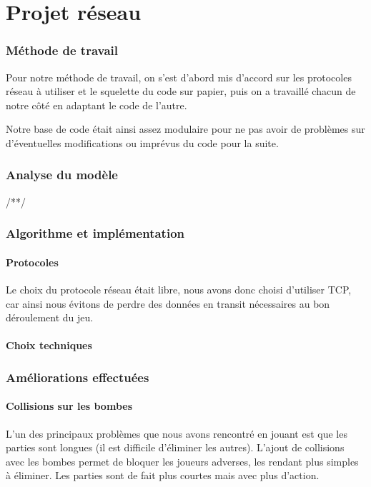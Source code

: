 \documentclass[a4paper]{article}
\begin{document}
\newpage
\part{Projet réseau}

	\section{Méthode de travail}

	Pour notre méthode de travail, on s'est d'abord mis d'accord sur les protocoles réseau à utiliser et le squelette du code sur papier, puis on a travaillé chacun de notre côté en adaptant le code de l'autre.

	Notre base de code était ainsi assez modulaire pour ne pas avoir de problèmes sur d'éventuelles modifications ou imprévus du code pour la suite.

	\section{Analyse du modèle}

	/**/

	\section{Algorithme et implémentation}
		\subsection{Protocoles}
		Le choix du protocole réseau était libre, nous avons donc choisi d'utiliser TCP, car ainsi nous évitons de perdre des données en transit nécessaires au bon déroulement du jeu.

		\subsection{Choix techniques}


	\section{Améliorations effectuées}
		\subsection{Collisions sur les bombes}
		L'un des principaux problèmes que nous avons rencontré en jouant est que les parties sont longues (il est difficile d'éliminer les autres).
		L'ajout de collisions avec les bombes permet de bloquer les joueurs adverses, les rendant plus simples à éliminer.
		Les parties sont de fait plus courtes mais avec plus d'action.
\end{document}
